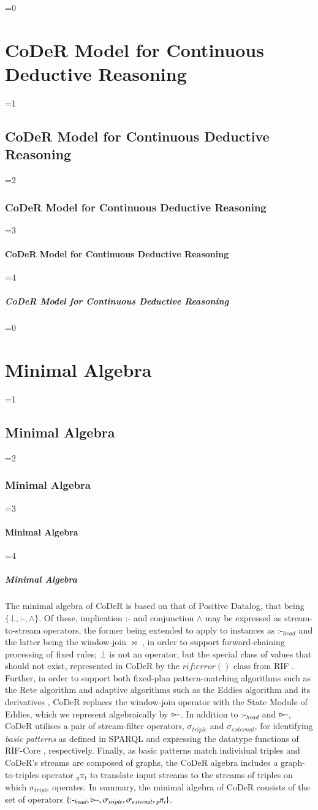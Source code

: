 \documentclass[twocolumn,preprint,3p,number]{elsarticle}
\theoremstyle{plain}
\theoremstyle{definition}
\newcounter{nestingdepth}
\newenvironment{nestedsection}[2]{
  \ifnum\value{nestingdepth}=0
    \chapter{#1}
  \else
    \ifnum\value{nestingdepth}=1
      \section{#1}
    \else
      \ifnum\value{nestingdepth}=2
        \subsection{#1}
      \else
        \ifnum\value{nestingdepth}=3
          \subsubsection{#1}
        \else
          \ifnum\value{nestingdepth}=4
            \paragraph{#1}
          \else
            \PackageError{nestedsections}{Maximum nesting level exceeded!}{uh oh!}
          \fi
        \fi
      \fi
    \fi
  \fi
  \addtocounter{nestingdepth}{1}
  \label{sec:#2}
}{\addtocounter{nestingdepth}{-1}}
\def\rstreamjoin{\mathbin{\rhd\mkern-2mu%
  \setbox0=\hbox{$\rhd$}%
    \rule[0.21em]{.5em}{.4pt}%
}}
\begin{document}
\begin{nestedsection}{CoDeR Model for Continuous Deductive Reasoning}{model}
  \begin{nestedsection}{Minimal Algebra}{model: algebra}
    The minimal algebra of CoDeR is based on that of Positive Datalog, that being ${\{\bot, \text{:-}, \wedge\}}$.
    Of these, implication $\text{:-}$ and conjunction $\wedge$ may be expressed as stream-to-stream operators, the former being extended to apply to instances as $\text{:-}_{head}$ and the latter being the window-join $\Join$ \citep{niagaraCQ}, in order to support forward-chaining processing of fixed rules;
    $\bot$ is not an operator, but the special class of values that should not exist, represented in CoDeR by the ${rif\text{:}error()}$ class from RIF \citep{w3crif}.
    Further, in order to support both fixed-plan pattern-matching algorithms such as the Rete algorithm \citep{forgy79} and adaptive algorithms such as the Eddies algorithm \citep{eddies} and its derivatives \citep{CACQ,TCQ}, CoDeR replaces the window-join operator with the State Module of Eddies, which we represent algebraically by $\rstreamjoin$.
    In addition to $\text{:-}_{head}$ and $\rstreamjoin$, CoDeR utilises a pair of stream-filter operators, $\sigma_{triple}$ and $\sigma_{external}$, for identifying \emph{basic patterns} as defined in SPARQL \citep{w3csparql} and expressing the datatype functions of RIF-Core \citep{w3crifcore}, respectively.
    Finally, as basic patterns match individual triples and CoDeR's streams are composed of graphs, the CoDeR algebra includes a graph-to-triples operator ${{}_g\pi_t}$ to translate input streams to the streams of triples on which $\sigma_{triple}$ operates.
    In summary, the minimal algebra of CoDeR consists of the set of operators ${\{\text{:-}_{head}, \rstreamjoin, \sigma_{triple}, \sigma_{external}, {}_g{\pi_t}\}}$.


\end{nestedsection}
\end{nestedsection}
\end{document}
